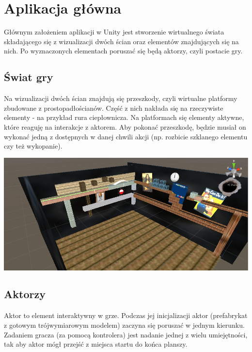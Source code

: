 \newpage
\section{Aplikacja główna}
\paragraph{}
Głównym założeniem aplikacji w Unity jest stworzenie wirtualnego świata składającego się z wizualizacji dwóch ścian oraz elementów znajdujących się na nich. Po wyznaczonych elementach poruszać się będą aktorzy, czyli postacie gry.

\subsection{Świat gry}
\paragraph{}
Na wizualizacji dwóch ścian znajdują się przeszkody, czyli wirtualne platformy zbudowane z prostopadłościanów. Część z nich nakłada się na rzeczywiste elementy - na przykład rura ciepłownicza. Na platformach się elementy aktywne, które reaguję na interakcje z aktorem. Aby pokonać przeszkodę, będzie musiał on wykonać jedną z dostępnych w danej chwili akcji (np. rozbicie szklanego elementu czy też wykopanie).

\begin{center}
\includegraphics[width=1\textwidth]{images/swiatgry.png}
\end{center}

\subsection{Aktorzy}
\paragraph{}
Aktor to element interaktywny w grze. Podczas jej inicjalizacji aktor (prefabrykat z gotowym trójwymiarowym modelem) zaczyna się poruszać w jednym kierunku. Zadaniem gracza (za pomocą kontrolera) jest nadanie jednej z wielu umiejętności, tak aby aktor mógł przejść z miejsca startu do końca planszy.


